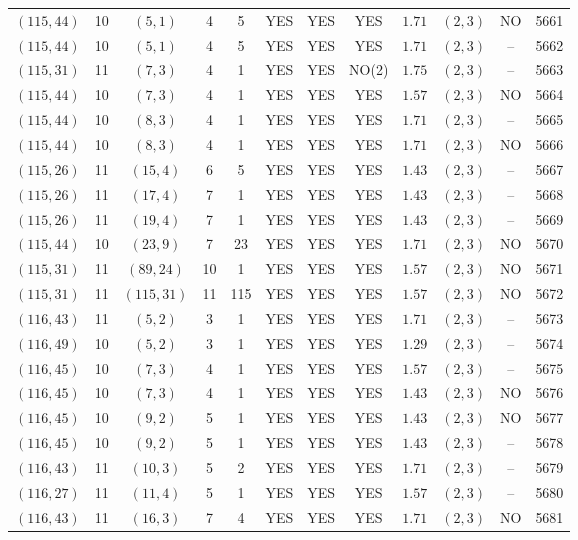 \begin{longtable}{|c|c|c|c|c|c|c|c|c|c|c|c|}
$(115,44)$ & 10 & $(5,1)$ & 4 & 5 & YES & YES & YES & $1.71$ & $(2,3)$ & NO & 5661\\
$(115,44)$ & 10 & $(5,1)$ & 4 & 5 & YES & YES & YES & $1.71$ & $(2,3)$ & -- & 5662\\
$(115,31)$ & 11 & $(7,3)$ & 4 & 1 & YES & YES & NO(2) & $1.75$ & $(2,3)$ & -- & 5663\\
$(115,44)$ & 10 & $(7,3)$ & 4 & 1 & YES & YES & YES & $1.57$ & $(2,3)$ & NO & 5664\\
$(115,44)$ & 10 & $(8,3)$ & 4 & 1 & YES & YES & YES & $1.71$ & $(2,3)$ & -- & 5665\\
$(115,44)$ & 10 & $(8,3)$ & 4 & 1 & YES & YES & YES & $1.71$ & $(2,3)$ & NO & 5666\\
$(115,26)$ & 11 & $(15,4)$ & 6 & 5 & YES & YES & YES & $1.43$ & $(2,3)$ & -- & 5667\\
$(115,26)$ & 11 & $(17,4)$ & 7 & 1 & YES & YES & YES & $1.43$ & $(2,3)$ & -- & 5668\\
$(115,26)$ & 11 & $(19,4)$ & 7 & 1 & YES & YES & YES & $1.43$ & $(2,3)$ & -- & 5669\\
$(115,44)$ & 10 & $(23,9)$ & 7 & 23 & YES & YES & YES & $1.71$ & $(2,3)$ & NO & 5670\\
$(115,31)$ & 11 & $(89,24)$ & 10 & 1 & YES & YES & YES & $1.57$ & $(2,3)$ & NO & 5671\\
$(115,31)$ & 11 & $(115,31)$ & 11 & 115 & YES & YES & YES & $1.57$ & $(2,3)$ & NO & 5672\\
$(116,43)$ & 11 & $(5,2)$ & 3 & 1 & YES & YES & YES & $1.71$ & $(2,3)$ & -- & 5673\\
$(116,49)$ & 10 & $(5,2)$ & 3 & 1 & YES & YES & YES & $1.29$ & $(2,3)$ & -- & 5674\\
$(116,45)$ & 10 & $(7,3)$ & 4 & 1 & YES & YES & YES & $1.57$ & $(2,3)$ & -- & 5675\\
$(116,45)$ & 10 & $(7,3)$ & 4 & 1 & YES & YES & YES & $1.43$ & $(2,3)$ & NO & 5676\\
$(116,45)$ & 10 & $(9,2)$ & 5 & 1 & YES & YES & YES & $1.43$ & $(2,3)$ & NO & 5677\\
$(116,45)$ & 10 & $(9,2)$ & 5 & 1 & YES & YES & YES & $1.43$ & $(2,3)$ & -- & 5678\\
$(116,43)$ & 11 & $(10,3)$ & 5 & 2 & YES & YES & YES & $1.71$ & $(2,3)$ & -- & 5679\\
$(116,27)$ & 11 & $(11,4)$ & 5 & 1 & YES & YES & YES & $1.57$ & $(2,3)$ & -- & 5680\\
$(116,43)$ & 11 & $(16,3)$ & 7 & 4 & YES & YES & YES & $1.71$ & $(2,3)$ & NO & 5681\\

\end{longtable}
